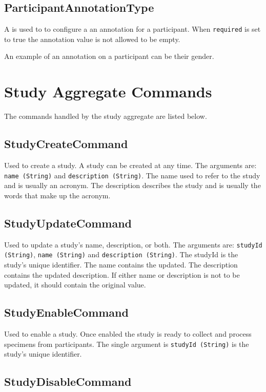 \subsection*{ParticipantAnnotationType}

A  is used to to configure a an
annotation for a participant. When \texttt{required} is set to true the
annotation value is not allowed to be empty.

An example of an annotation on a participant can be their gender.

\section {Study Aggregate Commands}

The commands handled by the study aggregate are listed below.

\subsection*{StudyCreateCommand}

Used to create a study. A study can be created at any time. The arguments are:
\texttt{name (String)} and \texttt{description (String)}. The name used to
refer to the study and is usually an acronym. The description describes the
study and is usually the words that make up the acronym.

\subsection*{StudyUpdateCommand}

Used to update a study's name, description, or both. The arguments are:
\texttt{studyId (String)}, \texttt{name (String)} and \texttt{description
  (String)}. The studyId is the study's unique identifier. The name contains
the updated. The description contains the updated description. If either name
or description is not to be updated, it should contain the original value.

\subsection*{StudyEnableCommand}

Used to enable a study. Once enabled the study is ready to collect and process
specimens from participants. The single argument is \texttt{studyId (String)}
is the study's unique identifier.

\subsection*{StudyDisableCommand}

